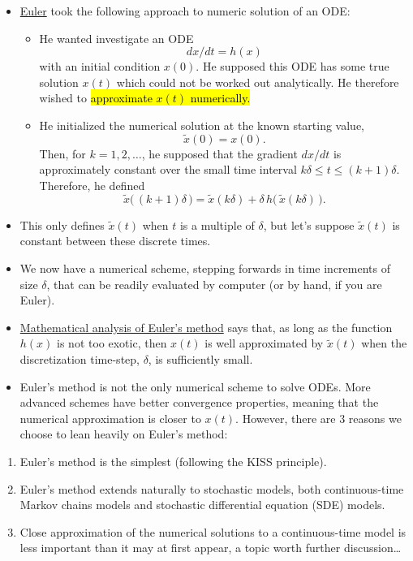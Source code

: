 \documentclass[]{article}
\providecommand{\tightlist}{%
  \setlength{\itemsep}{0pt}\setlength{\parskip}{0pt}}
\begin{document}
\begin{itemize}
\item
  \href{https://en.wikipedia.org/wiki/Leonhard_Euler}{Euler} took the
  following approach to numeric solution of an ODE:

  \begin{itemize}
  \tightlist
  \item
    He wanted investigate an ODE \[dx/dt = h(x)\] with an initial
    condition \(x(0)\). He supposed this ODE has some true solution
    \(x(t)\) which could not be worked out analytically. He therefore
    wished to \hl{approximate $x(t)$ numerically.}
  \item
    He initialized the numerical solution at the known starting value,
    \[\tilde x(0)=x(0).\] Then, for \(k=1,2,\dots\), he supposed that
    the gradient \(dx/dt\) is approximately constant over the small time
    interval \(k\delta\le t\le (k+1)\delta\). Therefore, he defined
    \[\tilde x\big( \,(k+1)\delta\,\big) = \tilde x( k\delta) + \delta \, h\big(\, \tilde x(k\delta)\,\big).\]
  \end{itemize}
\item
  This only defines \(\tilde x(t)\) when \(t\) is a multiple of
  \(\delta\), but let's suppose \(\tilde x(t)\) is constant between
  these discrete times.
\item
  We now have a numerical scheme, stepping forwards in time increments
  of size \(\delta\), that can be readily evaluated by computer (or by
  hand, if you are Euler).
\item
  \href{https://en.wikipedia.org/wiki/Euler_method}{Mathematical
  analysis of Euler's method} says that, as long as the function
  \(h(x)\) is not too exotic, then \(x(t)\) is well approximated by
  \(\tilde x(t)\) when the discretization time-step, \(\delta\), is
  sufficiently small.
\item
  Euler's method is not the only numerical scheme to solve ODEs. More
  advanced schemes have better convergence properties, meaning that the
  numerical approximation is closer to \(x(t)\). However, there are 3
  reasons we choose to lean heavily on Euler's method:
\end{itemize}

\begin{enumerate}
\def\labelenumi{\arabic{enumi}.}
\item
  Euler's method is the simplest (following the KISS principle).
\item
  Euler's method extends naturally to stochastic models, both
  continuous-time Markov chains models and stochastic differential
  equation (SDE) models.
\item
  Close approximation of the numerical solutions to a continuous-time
  model is less important than it may at first appear, a topic worth
  further discussion\ldots{}
\end{enumerate}
\end{document}
